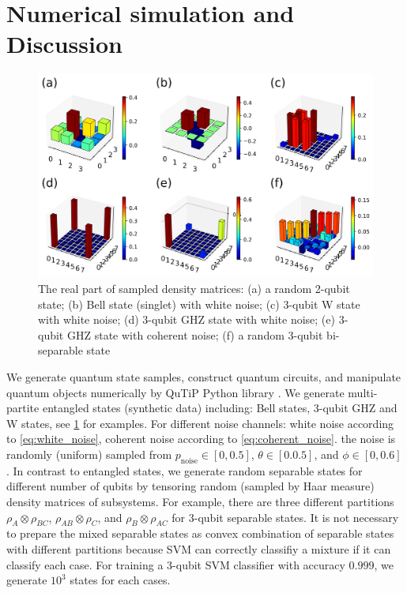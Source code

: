 \documentclass[
aps,
pra,
twocolumn,
floatfix,
]{revtex4-2}
\theoremstyle{plain}
\theoremstyle{definition}
\newcommand{\dm}{\rho}
\newcommand{\noise}{\text{noise}}
\begin{document}
\section{Numerical simulation and Discussion}\label{sec:numerical_simulation}
\begin{figure}[!ht]
	\centering
	\includegraphics[width=.9\linewidth]{./Code/dataset_sample_3x2.png}
	\caption{The real part of sampled density matrices: (a) a random 2-qubit state; (b) Bell state (singlet) with white noise; (c) 3-qubit W state with white noise; (d) 3-qubit GHZ state with white noise; (e) 3-qubit GHZ state with coherent noise; (f) a random 3-qubit bi-separable state}
	\label{fig:sample_data}
\end{figure}
We generate quantum state samples, construct quantum circuits, and manipulate quantum objects numerically by QuTiP Python library \cite{johanssonQuTiPPythonFramework2013} \cite{liPulselevelNoisyQuantum2022}.
We generate multi-partite entangled states (synthetic data) including: Bell states, 3-qubit GHZ and W states, see \cref{fig:sample_data} for examples.
For different noise channels: white noise according to \cref{eq:white_noise}, coherent noise according to \cref{eq:coherent_noise}.
the noise is randomly (uniform) sampled from $p_{\noise}\in[0,0.5]$, $\theta\in[0.0.5]$, and $\phi\in[0,0.6]$.
In contrast to entangled states, we generate random separable states for different number of qubits by tensoring random (sampled by Haar measure) density matrices of subsystems.
For example,
there are three different partitions $\dm_A\otimes \dm_{BC}$, $\dm_{AB}\otimes \dm_{C}$, and $\dm_B\otimes \dm_{AC}$ for 3-qubit separable states.
It is not necessary to prepare the mixed separable states as convex combination of separable states with different partitions 
because SVM can correctly classifiy a mixture if it can classify each case.
For training a 3-qubit SVM classifier with accuracy $0.999$, we generate $10^3$ states for each cases.
\end{document}
